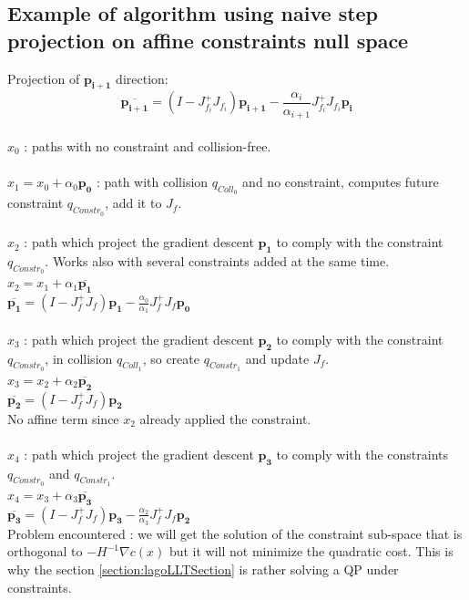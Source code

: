 \documentclass {article}
\newcommand\p{\mathbf{p_i}}
\newcommand\Jfi{J_{f_i}}
\begin{document}
\subsection{Example of algorithm using naive step projection on affine 
constraints null space} \label{section:naiveProjectionSection}
Projection of $\mathbf{p_{i+1}}$ direction:
$$\mathbf{\overline{p_{i+1}}} = (I-\Jfi^{+}\Jfi) \mathbf{p_{i+1}} - 
\frac{\alpha_i}{\alpha_{i+1}} \Jfi^{+}\Jfi \p$$\\
$x_0$ : paths with no constraint and collision-free. \\
\\
$x_1 = x_0 + \alpha_0 \mathbf{p_0}$ : path with collision $q_{Coll_0}$ and no 
constraint, computes future constraint $q_{Constr_0}$, add it to $J_f$.\\
\\
$x_2$ : path which project the gradient descent $\mathbf{p_1}$ to comply with 
the constraint $q_{Constr_0}$. Works also with several constraints added at the 
same time. \\
$x_2 = x_1 + \alpha_1 \mathbf{\overline{p_1}}$ \\
$\mathbf{\overline{p_1}} = (I-J_f^{+}J_f) \mathbf{p_1} - \frac{\alpha_0}
{\alpha_1}J_f^{+}J_f \mathbf{p_0}$ \\
\\
$x_3$ : path which project the gradient descent $\mathbf{p_2}$ to comply with 
the constraint $q_{Constr_0}$, in collision $q_{Coll_1}$, so create $q_{Constr_1}$ 
and update $J_f$. \\
$x_3 = x_2 + \alpha_2 \mathbf{\overline{p_2}}$ \\
$\mathbf{\overline{p_2}} = (I-J_f^{+}J_f) \mathbf{p_2}$ \\
No affine term since $x_2$ already applied the constraint. \\
\\
$x_4$ : path which project the gradient descent $\mathbf{p_3}$ to comply with 
the constraints $q_{Constr_0}$ and $q_{Constr_1}$. \\
$x_4 = x_3 + \alpha_3 \mathbf{\overline{p_3}}$ \\
$\mathbf{\overline{p_3}} = (I-J_f^{+}J_f) \mathbf{p_3} - \frac{\alpha_2}
{\alpha_3} J_f^{+}J_f \mathbf{p_2}$ \\

Problem encountered : we will get the solution of the constraint sub-space 
that is orthogonal to $-H^{-1}\nabla c(x)$ but it will not minimize the 
quadratic cost. This is why the section \ref{section:lagoLLTSection} is rather solving 
a QP under constraints.
\end{document}
